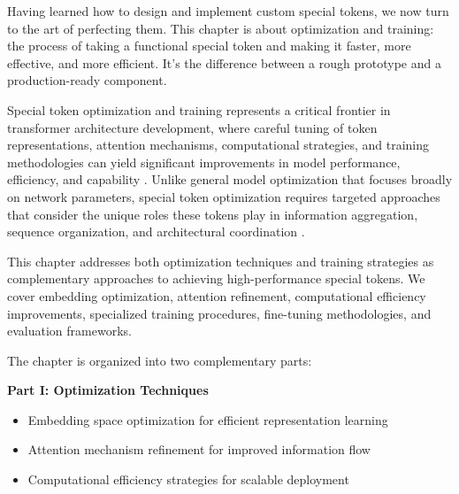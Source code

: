 
Having learned how to design and implement custom special tokens, we now turn to the art of perfecting them. This chapter is about optimization and training: the process of taking a functional special token and making it faster, more effective, and more efficient. It's the difference between a rough prototype and a production-ready component.

Special token optimization and training represents a critical frontier in transformer architecture development, where careful tuning of token representations, attention mechanisms, computational strategies, and training methodologies can yield significant improvements in model performance, efficiency, and capability \citep{rae2021scaling, hoffmann2022training}. Unlike general model optimization that focuses broadly on network parameters, special token optimization requires targeted approaches that consider the unique roles these tokens play in information aggregation, sequence organization, and architectural coordination \citep{touvron2023llama}.

This chapter addresses both optimization techniques and training strategies as complementary approaches to achieving high-performance special tokens. We cover embedding optimization, attention refinement, computational efficiency improvements, specialized training procedures, fine-tuning methodologies, and evaluation frameworks.

\begin{comment}
Feedback: This is a strong opening. To make it even more compelling, you could frame it as moving from "design" to "refinement." For example: "Having learned how to design and implement custom special tokens, we now turn to the art of perfecting them. This chapter is about optimization: the process of taking a functional special token and making it faster, more effective, and more efficient. It's the difference between a rough prototype and a production-ready component."

STATUS: addressed - integrated the suggested framing and expanded to include training aspects
\end{comment}

The chapter is organized into two complementary parts:

\textbf{Part I: Optimization Techniques}
\begin{itemize}
\item Embedding space optimization for efficient representation learning
\item Attention mechanism refinement for improved information flow
\item Computational efficiency strategies for scalable deployment
\end{itemize}

